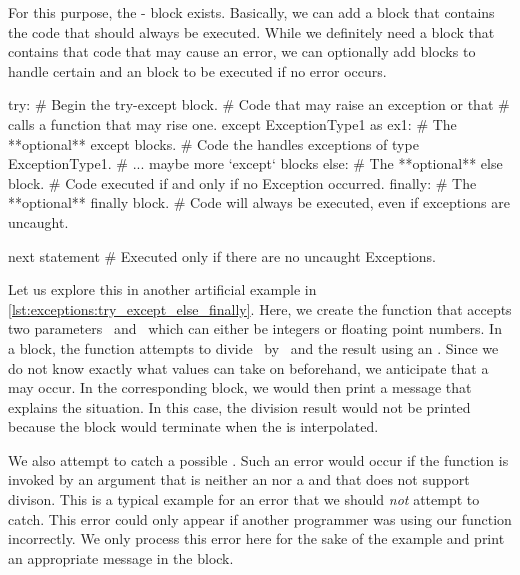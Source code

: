 For this purpose, the - block exists.
Basically, we can add a  block that contains the code that should always be executed.
While we definitely need a  block that contains that code that may cause an error, we can optionally add  blocks to handle certain  and an  block to be executed if no error occurs.%
%
\begin{pythonSyntax}
try:  # Begin the try-except block.
    # Code that may raise an exception or that
    # calls a function that may rise one.
except ExceptionType1 as ex1:  # The **optional** except blocks.
    # Code the handles exceptions of type ExceptionType1.
# ... maybe more `except` blocks
else:  # The **optional** else block.
    # Code executed if and only if no Exception occurred.
finally:  # The **optional** finally block.
    # Code will always be executed, even if exceptions are uncaught.

next statement  # Executed only if there are no uncaught Exceptions.
\end{pythonSyntax}
%
%
%
%
\begin{sloppypar}%
Let us explore this in another artificial example in \cref{lst:exceptions:try_except_else_finally}.
Here, we create the function  that accepts two parameters~ and~ which can either be integers or floating point numbers.
In a  block, the function attempts to divide~ by~ and  the result using an .
Since we do not know exactly what values  can take on beforehand, we anticipate that a  may occur.
In the corresponding  block, we would then print a message that explains the situation.
In this case, the division result would not be printed because the  block would terminate when the  is interpolated.%
\end{sloppypar}%
%
We also attempt to catch a possible .
Such an error would occur if the function is invoked by an argument that is neither an  nor a  and that does not support divison.
This is a typical example for an error that we should \emph{not} attempt to catch.
This error could only appear if another programmer was using our function incorrectly.
We only process this error here for the sake of the example and print an appropriate message in the  block.

